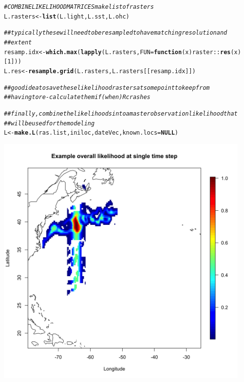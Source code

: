 \documentclass{article}\usepackage[]{graphicx}\usepackage[]{color}
\makeatletter
\newcommand{\hlnum}[1]{\textcolor[rgb]{0.686,0.059,0.569}{#1}}%
\newcommand{\hlcom}[1]{\textcolor[rgb]{0.678,0.584,0.686}{\textit{#1}}}%
\newcommand{\hlopt}[1]{\textcolor[rgb]{0,0,0}{#1}}%
\newcommand{\hlstd}[1]{\textcolor[rgb]{0.345,0.345,0.345}{#1}}%
\newcommand{\hlkwa}[1]{\textcolor[rgb]{0.161,0.373,0.58}{\textbf{#1}}}%
\newcommand{\hlkwb}[1]{\textcolor[rgb]{0.69,0.353,0.396}{#1}}%
\newcommand{\hlkwc}[1]{\textcolor[rgb]{0.333,0.667,0.333}{#1}}%
\newcommand{\hlkwd}[1]{\textcolor[rgb]{0.737,0.353,0.396}{\textbf{#1}}}%
\newenvironment{kframe}{%
 \def\at@end@of@kframe{}%
 \ifinner\ifhmode%
  \def\at@end@of@kframe{\end{minipage}}%
  \begin{minipage}{\columnwidth}%
 \fi\fi%
 \def\FrameCommand##1{\hskip\@totalleftmargin \hskip-\fboxsep
 \colorbox{shadecolor}{##1}\hskip-\fboxsep
     \hskip-\linewidth \hskip-\@totalleftmargin \hskip\columnwidth}%
 \MakeFramed {\advance\hsize-\width
   \@totalleftmargin\z@ \linewidth\hsize
   \@setminipage}}%
 {\par\unskip\endMakeFramed%
 \at@end@of@kframe}
\newenvironment{knitrout}{}{} %
\makeatother
\begin{document}
\begin{knitrout}\small
{}\color{fgcolor}\begin{kframe}
\begin{alltt}
\hlcom{# COMBINE LIKELIHOOD MATRICES make list of rasters}
\hlstd{L.rasters} \hlkwb{<-} \hlkwd{list}\hlstd{(L.light, L.sst, L.ohc)}

\hlcom{## typically these will need to be resampled to have matching resolution and}
\hlcom{## extent}
\hlstd{resamp.idx} \hlkwb{<-} \hlkwd{which.max}\hlstd{(}\hlkwd{lapply}\hlstd{(L.rasters,} \hlkwc{FUN} \hlstd{=} \hlkwa{function}\hlstd{(}\hlkwc{x}\hlstd{) raster}\hlopt{::}\hlkwd{res}\hlstd{(x)[}\hlnum{1}\hlstd{]))}
\hlstd{L.res} \hlkwb{<-} \hlkwd{resample.grid}\hlstd{(L.rasters, L.rasters[[resamp.idx]])}

\hlcom{## good idea to save these likelihood rasters at some point to keep from}
\hlcom{## having to re-calculate them if (when) R crashes}

\hlcom{## finally, combine the likelihoods into a master observation likelihood that}
\hlcom{## will be used for the modeling}
\hlstd{L} \hlkwb{<-} \hlkwd{make.L}\hlstd{(ras.list, iniloc, dateVec,} \hlkwc{known.locs} \hlstd{=} \hlkwa{NULL}\hlstd{)}
\end{alltt}
\end{kframe}
\end{knitrout}

\includegraphics[width=5in, keepaspectratio]{./example_L.png}
\end{document}
